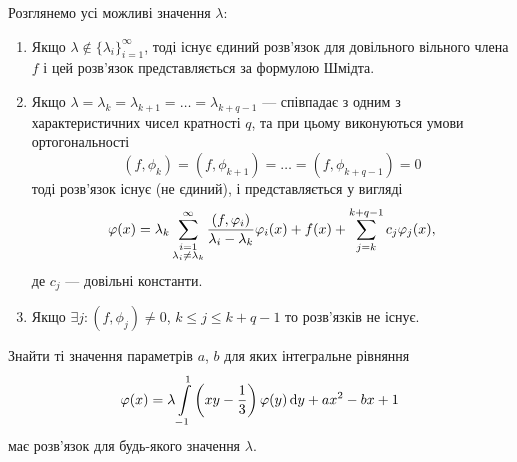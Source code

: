 Розглянемо усі можливі значення $\lambda$:
\begin{enumerate}
    \item Якщо $\lambda \notin \{\lambda_i\}_{i=1}^\infty$, тоді існує єдиний розв'язок для довільного вільного члена $f$ і цей розв'язок представляється за формулою Шмідта.
    
    \item Якщо $\lambda = \lambda_k = \lambda_{k + 1} = \ldots = \lambda_{k + q - 1}$ --- співпадає з одним з характеристичних чисел кратності $q$, та при цьому виконуються умови ортогональності
    \begin{equation}
        (f, \phi_k) = (f, \phi_{k + 1}) = \ldots = (f, \phi_{k + q - 1}) = 0
    \end{equation}
    тоді розв'язок існує (не єдиний), і представляється у вигляді 
    \begin{equation}
        \varphi(x) = \lambda_k \displaystyle\sum\limits_{\substack{i = 1 \\ \lambda_i \ne \lambda_k}}^\infty \dfrac{(f, \varphi_i)}{\lambda_i - \lambda_k} \varphi_i(x) + f(x) + \displaystyle\sum\limits_{j = k}^{k + q - 1} c_j \varphi_j(x),
    \end{equation}
    де $c_j$ --- довільні константи.

    \item Якщо $\exists j: (f, \phi_j) \ne 0$, $k \le j \le k + q - 1$ то розв'язків не існує.
\end{enumerate}

\newpage

\begin{example}
    Знайти ті значення параметрів $a$, $b$ для яких інтегральне рівняння
    \begin{equation*}
        \varphi(x) = \lambda \displaystyle\int\limits_{-1}^1 \left( xy - \dfrac{1}{3} \right) \varphi(y) \mathop{}\!\mathrm{d} y + ax^2 - bx + 1 
    \end{equation*}
    має розв'язок для будь-якого значення $\lambda$.
\end{example}

